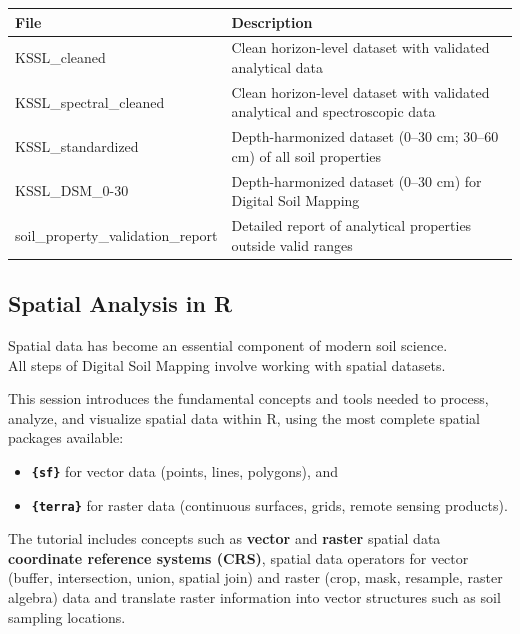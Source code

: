 \documentclass[
  10pt,
  b5paper,
  oneside]{book}
\providecommand{\tightlist}{%
  \setlength{\itemsep}{0pt}\setlength{\parskip}{0pt}}
\begin{document}
\begin{longtable}[]{@{}
  >{\raggedright\arraybackslash}p{}
  >{\raggedright\arraybackslash}p{}@{}}
\toprule\noalign{}
\begin{minipage}[b]{\linewidth}\raggedright
File
\end{minipage} & \begin{minipage}[b]{\linewidth}\raggedright
Description
\end{minipage} \\
\midrule\noalign{}
\endhead
\bottomrule\noalign{}
\endlastfoot
KSSL\_cleaned & Clean horizon-level dataset with validated analytical data \\
KSSL\_spectral\_cleaned & Clean horizon-level dataset with validated analytical and spectroscopic data \\
KSSL\_standardized & Depth-harmonized dataset (0--30 cm; 30--60 cm) of all soil properties \\
KSSL\_DSM\_0-30 & Depth-harmonized dataset (0--30 cm) for Digital Soil Mapping \\
soil\_property\_validation\_report & Detailed report of analytical properties outside valid ranges \\
\end{longtable}

\subsection{Spatial Analysis in R}\label{spatial-analysis-in-r}

Spatial data has become an essential component of modern soil science.\\
All steps of Digital Soil Mapping involve working with spatial datasets.

This session introduces the fundamental concepts and tools needed to process, analyze, and visualize spatial data within R, using the most complete spatial packages available:

\begin{itemize}
\tightlist
\item
  \textbf{\texttt{\{sf\}}} for vector data (points, lines, polygons), and\\
\item
  \textbf{\texttt{\{terra\}}} for raster data (continuous surfaces, grids, remote sensing products).
\end{itemize}

The tutorial includes concepts such as \textbf{vector} and \textbf{raster} spatial data \textbf{coordinate reference systems (CRS)}, spatial data operators for vector (buffer, intersection, union, spatial join) and raster (crop, mask, resample, raster algebra) data and translate raster information into vector structures such as soil sampling locations.
\end{document}

